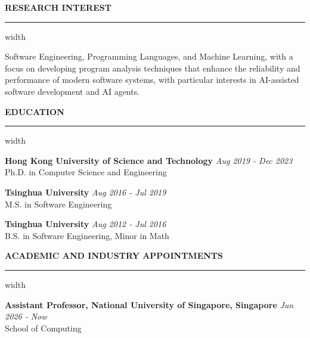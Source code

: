 \documentclass[centered]{resume}
\newlength{\cvsectiongap}
\newenvironment{rSection}[1]{%
  \par\Needspace{5\baselineskip}\addvspace{\cvsectiongap}
  {\bfseries \MakeUppercase{#1}}\vspace{0.65em}%
  \noindent\hrule width \linewidth\vspace{-0.45em}\par
}{\par}
\begin{document}
\begin{resume}


\vspace{1mm}

\begin{rSection}{Research Interest}
Software Engineering, Programming Languages, and Machine Learning, with a focus on developing program analysis techniques that enhance the reliability and performance of modern software systems, with particular interests in AI-assisted software development and AI agents.
\end{rSection}

\begin{rSection}{Education}
\textbf{Hong Kong University of Science and Technology} \hfill {\em Aug 2019 - Dec 2023} 
\\ Ph.D. in Computer Science and Engineering

\vspace{-1mm}

{\bf Tsinghua University} \hfill {\em Aug 2016 - Jul 2019} 
\\ M.S. in Software Engineering \hfill

\vspace{-1mm}

{\bf Tsinghua University} \hfill {\em Aug 2012 - Jul 2016} 
\\ B.S. in Software Engineering, Minor in Math \hfill

\end{rSection}


\begin{rSection}{ACADEMIC AND INDUSTRY APPOINTMENTS}
\textbf{Assistant Professor, National University of Singapore, Singapore} \hfill {\em Jun 2026 - Now}
\\ School of Computing
\vspace{-2mm}


\end{rSection}
\end{resume}
\end{document}
